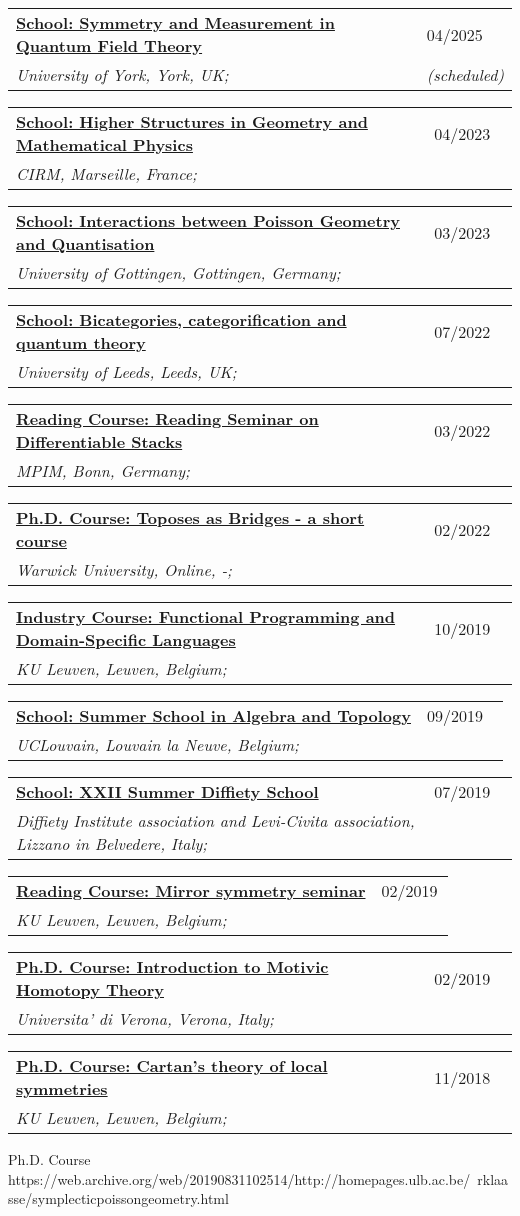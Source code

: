 \documentclass[a4paper]{article}
\newcommand{\longvoice}[8]{
	\begin{tabular}{p{0.83\linewidth} p{0.17\linewidth} }
		\textbf{\href{#3}{#2: #1}} & #4 
		\\ 
		\textit{#5, #6, #7;} & {\small\emph{#8}}
	\end{tabular}
	\vspace{.5em}
}
\begin{document}
	\longvoice{Symmetry and Measurement in Quantum Field Theory}
		{School}
		{https://sites.google.com/york.ac.uk/symmetry-measurement-school/home?authuser=0}
		{04/2025}
		{University of York}
		{York}
		{UK}
		{(scheduled)}
	\longvoice{Higher Structures in Geometry and Mathematical Physics}
		{School}
		{https://conferences.cirm-math.fr/2697.html}
		{04/2023}
		{CIRM}
		{Marseille}
		{France}
		{}
	\longvoice{Interactions between Poisson Geometry and Quantisation}
		{School}
		{https://sites.google.com/view/poissonquantisation2023}
		{03/2023}
		{University of Gottingen}
		{Gottingen}
		{Germany}
		{}
	\longvoice{Bicategories, categorification and quantum theory}
		{School}
		{https://conferences.leeds.ac.uk/bcqt2022/}
		{07/2022}
		{University of Leeds}
		{Leeds}
		{UK}
		{}
	\longvoice{Reading Seminar on Differentiable Stacks}
		{Reading Course}
		{https://www.dropbox.com/s/a9tmw4g8m58ymkf/2203-Bonn-StackReadingSeminar.pdf?dl=0}
		{03/2022}
		{MPIM}
		{Bonn}
		{Germany}
		{}
	\longvoice{Toposes as Bridges - a short course}
		{Ph.D. Course}
		{https://warwick.ac.uk/fac/sci/maths/research/events/events2021-22/toposesasbridges/}
		{02/2022}
		{Warwick University}
		{Online}
		{-}
		{}
	\longvoice{Functional Programming and Domain-Specific Languages}
		{Industry Course}
		{https://dtai.cs.kuleuven.be/events/fpcourse/}
		{10/2019}
		{KU Leuven}
		{Leuven}
		{Belgium}
		{}
	\longvoice{Summer School in Algebra and Topology}
		{School}
		{https://web.archive.org/save/https://uclouvain.be/en/research-institutes/irmp/summer-school-in-algebra-and-topology-2019.html}
		{09/2019}
		{UCLouvain}
		{Louvain la Neuve}
		{Belgium}
		{}
	\longvoice{XXII Summer Diffiety School}
		{School}
		{https://sites.google.com/site/levicivitainstitute/Activities/DiffietySchools/xxii-summer-diffiety-school}
		{07/2019}
		{Diffiety Institute association and Levi-Civita association}
		{Lizzano in Belvedere}
		{Italy}
		{}
	\longvoice{Mirror symmetry seminar}
		{Reading Course}
		{https://wis.kuleuven.be/algebra/mirror-symmetry-seminar}
		{02/2019}
		{KU Leuven}
		{Leuven}
		{Belgium}
		{}
	\longvoice{Introduction to Motivic Homotopy Theory}
		{Ph.D. Course}
		{https://www.dropbox.com/s/fpqd1xsz4g8ecu4/1902-Verona-MotivicHomotopy.pdf?dl=0}
		{02/2019}
		{Universita' di Verona}
		{Verona}
		{Italy}
		{}
	\longvoice{Cartan's theory of local symmetries}
		{Ph.D. Course}
		{https://wis.kuleuven.be/methusalem-pure-math/methusalem-lecture-series/methusalem-lecture-series}
		{11/2018}
		{KU Leuven}
		{Leuven}
		{Belgium}
		{}
		{Ph.D. Course}
		{https://web.archive.org/web/20190831102514/http://homepages.ulb.ac.be/~rklaasse/symplecticpoissongeometry.html}
\end{document}
